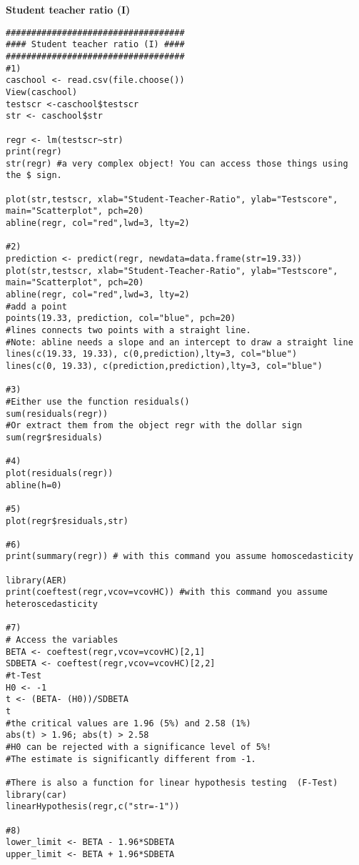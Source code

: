 \documentclass{article}
\begin{document}
\begin{solution}
\textbf{Student teacher ratio (I)}

\begin{verbatim}
###################################
#### Student teacher ratio (I) ####
###################################
#1)
caschool <- read.csv(file.choose())
View(caschool)
testscr <-caschool$testscr
str <- caschool$str

regr <- lm(testscr~str)
print(regr)
str(regr) #a very complex object! You can access those things using the $ sign.

plot(str,testscr, xlab="Student-Teacher-Ratio", ylab="Testscore", main="Scatterplot", pch=20)
abline(regr, col="red",lwd=3, lty=2)

#2)
prediction <- predict(regr, newdata=data.frame(str=19.33))
plot(str,testscr, xlab="Student-Teacher-Ratio", ylab="Testscore", main="Scatterplot", pch=20)
abline(regr, col="red",lwd=3, lty=2)
#add a point
points(19.33, prediction, col="blue", pch=20)
#lines connects two points with a straight line.
#Note: abline needs a slope and an intercept to draw a straight line
lines(c(19.33, 19.33), c(0,prediction),lty=3, col="blue")
lines(c(0, 19.33), c(prediction,prediction),lty=3, col="blue")

#3)
#Either use the function residuals()
sum(residuals(regr))
#Or extract them from the object regr with the dollar sign
sum(regr$residuals)

#4)
plot(residuals(regr))
abline(h=0)

#5)
plot(regr$residuals,str)

#6)
print(summary(regr)) # with this command you assume homoscedasticity

library(AER)
print(coeftest(regr,vcov=vcovHC)) #with this command you assume heteroscedasticity

#7)
# Access the variables
BETA <- coeftest(regr,vcov=vcovHC)[2,1]
SDBETA <- coeftest(regr,vcov=vcovHC)[2,2]
#t-Test
H0 <- -1
t <- (BETA- (H0))/SDBETA
t
#the critical values are 1.96 (5%) and 2.58 (1%)
abs(t) > 1.96; abs(t) > 2.58
#H0 can be rejected with a significance level of 5%!
#The estimate is significantly different from -1.

#There is also a function for linear hypothesis testing  (F-Test)
library(car)
linearHypothesis(regr,c("str=-1"))

#8)
lower_limit <- BETA - 1.96*SDBETA
upper_limit <- BETA + 1.96*SDBETA


\end{verbatim}
\end{solution}
\end{document}
